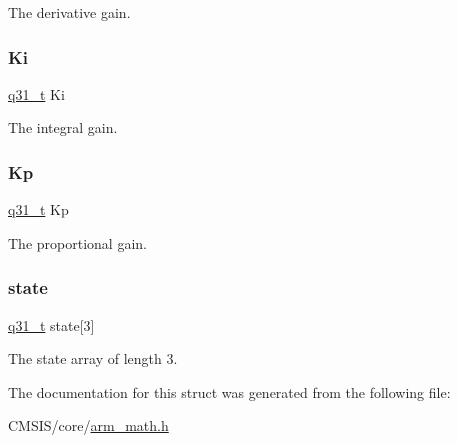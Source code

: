 The derivative gain. \mbox{\label{structarm__pid__instance__q31_a84a6c05c16369c905193da0d5fc9a7b0}} 
\subsubsection{\texorpdfstring{Ki}{Ki}}
{\footnotesize\ttfamily \mbox{\hyperlink{arm__math_8h_adc89a3547f5324b7b3b95adec3806bc0}{q31\+\_\+t}} Ki}

The integral gain. \mbox{\label{structarm__pid__instance__q31_a6ec4b37fe2246a7e017dd07578fe5bbd}} 
\subsubsection{\texorpdfstring{Kp}{Kp}}
{\footnotesize\ttfamily \mbox{\hyperlink{arm__math_8h_adc89a3547f5324b7b3b95adec3806bc0}{q31\+\_\+t}} Kp}

The proportional gain. \mbox{\label{structarm__pid__instance__q31_af0a2da4da9a94af652873ec7e7be4880}} 
\subsubsection{\texorpdfstring{state}{state}}
{\footnotesize\ttfamily \mbox{\hyperlink{arm__math_8h_adc89a3547f5324b7b3b95adec3806bc0}{q31\+\_\+t}} state\mbox{[}3\mbox{]}}

The state array of length 3. 

The documentation for this struct was generated from the following file\+:\begin{DoxyCompactItemize}
\item 
C\+M\+S\+I\+S/core/\mbox{\hyperlink{arm__math_8h}{arm\+\_\+math.\+h}}\end{DoxyCompactItemize}
